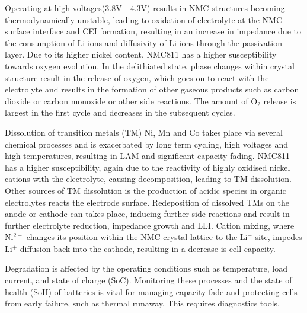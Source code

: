 \documentclass[journal=jacsat,manuscript=article]{achemso}
\begin{document}
Operating at high voltages(3.8V - 4.3V) results in NMC structures becoming thermodynamically unstable, leading to oxidation of electrolyte at the NMC surface interface and CEI formation, resulting in an increase in impedance due to the consumption of Li ions and diffusivity of Li ions through the passivation layer.\cite{jung2017oxygen,jung2017chemical,jung2018temperature,lin2014surface} Due to its higher nickel content, NMC811 has a higher susceptibility towards oxygen evolution.\cite{Phillip2020} In the delithiated state, phase changes within crystal structure result in the release of oxygen, which goes on to react with the electrolyte and results in the formation of other gaseous products such as carbon dioxide or carbon monoxide or other side reactions.\cite{Xiong2017} The amount of O$_2$ release is largest in the first cycle and decreases in the subsequent cycles. \cite{jung2017oxygen}

Dissolution of transition metals (TM) Ni, Mn and Co takes place via several chemical processes and is exacerbated by long term cycling, high voltages and high temperatures, resulting in LAM and significant capacity fading. \cite{li2018temperature} NMC811 has a higher susceptibility, again due to the reactivity of highly oxidised nickel cations with the electrolyte, causing decomposition, leading to TM dissolution.\cite{billy2018dissolution} Other sources of TM dissolution is the production of acidic species in organic electrolytes reacts the electrode surface.\cite{Zheng2012} Redeposition of dissolved TMs on the anode or cathode can takes place, inducing further side reactions and result in further electrolyte reduction, impedance growth and LLI.\cite{Zheng2012} Cation mixing, where  Ni$^{2+}$ changes its position within the NMC crystal lattice to the Li$^{+}$ site, impedes Li$^{+}$ diffusion back into the cathode, resulting in a decrease is cell capacity.\cite{Sari2019} 

Degradation is affected by the operating conditions such as temperature, load current, and state of charge (SoC). Monitoring these processes and the state of health (SoH) of batteries is vital for managing capacity fade and protecting cells from early failure, such as thermal runaway. This requires diagnostics tools. 
\end{document}

